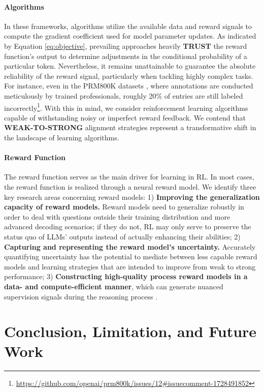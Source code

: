 \begin{itemize}[topsep=0pt]
\begin{itemize}[topsep=0pt]
\paragraph{Algorithms} In these frameworks, algorithms utilize the available data and reward signals to compute the gradient coefficient used for model parameter updates. As indicated by Equation \ref{eq:objective}, prevailing approaches heavily \textbf{TRUST} the reward function’s output to determine adjustments in the conditional probability of a particular token. Nevertheless, it remains unattainable to guarantee the absolute reliability of the reward signal, particularly when tackling highly complex tasks. For instance, even in the PRM800K datasets \citep{lightman2023let}, where annotations are conducted meticulously by trained professionals, roughly 20\% of entries are still labeled incorrectly\footnote{\url{https://github.com/openai/prm800k/issues/12\#issuecomment-1728491852}}. With this in mind, we consider reinforcement learning algorithms capable of withstanding noisy or imperfect reward feedback. We contend that \textbf{WEAK-TO-STRONG} alignment strategies \citep{burns2023weak} represent a transformative shift in the landscape of learning algorithms.

\paragraph{Reward Function} The reward function serves as the main driver for learning in RL. In most cases, the reward function is realized through a neural reward model. We identify three key research areas concerning reward models: 1) \textbf{Improving the generalization capacity of reward models.} Reward models need to generalize robustly in order to deal with questions outside their training distribution and more advanced decoding scenarios; if they do not, RL may only serve to preserve the status quo of LLMs’ outputs instead of actually enhancing their abilities; 2) \textbf{Capturing and representing the reward model’s uncertainty.} Accurately quantifying uncertainty has the potential to mediate between less capable reward models and learning strategies that are intended to improve from weak to strong performance; 3) \textbf{Constructing high-quality process reward models in a data- and compute-efficient manner}, which can generate nuanced supervision signals during the reasoning process \citep{lightman2023let,wang2023math}.

\section{Conclusion, Limitation, and Future Work}


\end{itemize}
\end{itemize}

